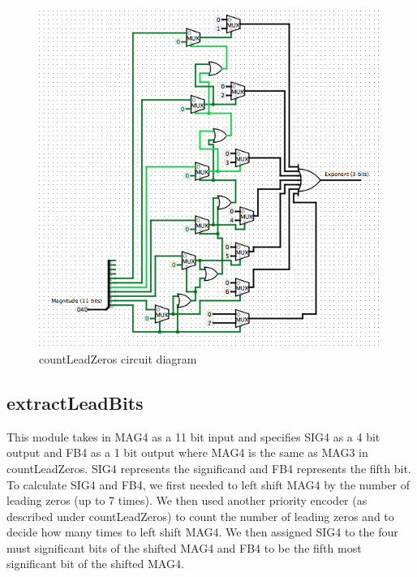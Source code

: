 \documentclass{article}
\begin{document}
\begin{figure}[H]
	\begin{center}
		\includegraphics[width=1\textwidth]{countLeadingZerosCircuitD.png} 
		\caption{countLeadZeros circuit diagram}
	\end{center}
\end{figure}

\subsection*{extractLeadBits}
This module takes in MAG4 as a 11 bit input and specifies SIG4 as a 4 bit output and FB4 as a 1 bit output where MAG4 is the same as MAG3 in countLeadZeros. SIG4 represents the significand and FB4 represents the fifth bit. To calculate SIG4 and FB4, we first needed to left shift MAG4 by the number of leading zeros (up to 7 times). We then used another priority encoder (as described under countLeadZeros) to count the number of leading zeros and to decide how many times to left shift MAG4. We then assigned SIG4 to the four must significant bits of the shifted MAG4 and FB4 to be the fifth most significant bit of the shifted MAG4.
\end{document}

